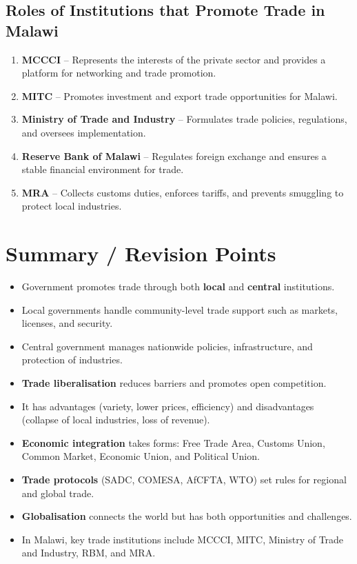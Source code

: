 \documentclass[12pt,a4paper, openany]{book}
\begin{document}
\subsection{Roles of Institutions that Promote Trade in Malawi}
\begin{enumerate}
	\item \textbf{MCCCI} – Represents the interests of the private sector and provides a platform for networking and trade promotion.
	\item \textbf{MITC} – Promotes investment and export trade opportunities for Malawi.
	\item \textbf{Ministry of Trade and Industry} – Formulates trade policies, regulations, and oversees implementation.
	\item \textbf{Reserve Bank of Malawi} – Regulates foreign exchange and ensures a stable financial environment for trade.
	\item \textbf{MRA} – Collects customs duties, enforces tariffs, and prevents smuggling to protect local industries.
\end{enumerate}

\section*{Summary / Revision Points}
\begin{itemize}
	\item Government promotes trade through both \textbf{local} and \textbf{central} institutions.
	\item Local governments handle community-level trade support such as markets, licenses, and security.
	\item Central government manages nationwide policies, infrastructure, and protection of industries.
	\item \textbf{Trade liberalisation} reduces barriers and promotes open competition.
	\item It has advantages (variety, lower prices, efficiency) and disadvantages (collapse of local industries, loss of revenue).
	\item \textbf{Economic integration} takes forms: Free Trade Area, Customs Union, Common Market, Economic Union, and Political Union.
	\item \textbf{Trade protocols} (SADC, COMESA, AfCFTA, WTO) set rules for regional and global trade.
	\item \textbf{Globalisation} connects the world but has both opportunities and challenges.
	\item In Malawi, key trade institutions include MCCCI, MITC, Ministry of Trade and Industry, RBM, and MRA.
\end{itemize}
\end{document}
